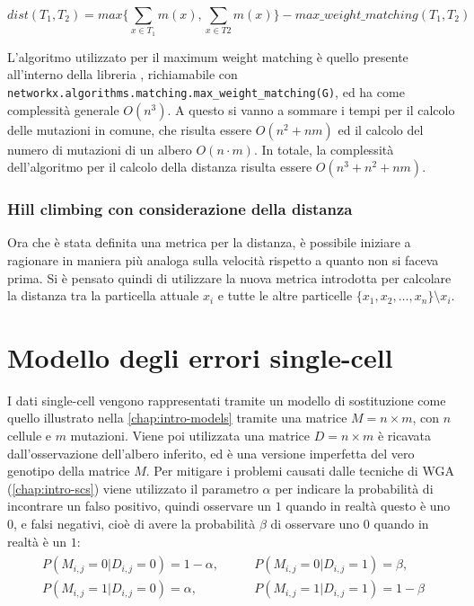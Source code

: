 \begin{equation}
  \label{eq:pso-adapt-calculate-2-algo-1}
  dist(T_1, T_2) = max \{ \sum_{x \in T_1} m(x), \sum_{x \in T2} m(x) \} - max\_weight\_matching(T_1, T_2)
\end{equation}

L'algoritmo utilizzato per il maximum weight matching è quello presente all'interno della libreria , 
richiamabile con \texttt{networkx.algorithms.matching.max\_weight\_matching(G)}, ed ha come complessità generale $O(n^3)$. A questo si vanno a sommare i tempi per il calcolo delle mutazioni in comune, che risulta essere $O(n^2 + nm)$ ed il calcolo del numero di mutazioni di un albero $O(n \cdot m)$. In totale, la complessità dell'algoritmo per il calcolo della distanza risulta essere $O(n^3 + n^2 + nm)$.

\subsubsection{Hill climbing con considerazione della distanza}
Ora che è stata definita una metrica per la distanza, è possibile iniziare a ragionare in maniera più analoga sulla velocità rispetto a quanto non si faceva prima. Si è pensato quindi di utilizzare la nuova metrica introdotta per calcolare la distanza tra la particella attuale $x_i$ e tutte le altre particelle $\{x_1, x_2, \dots, x_n\} \setminus x_i$.

\section{Modello degli errori single-cell}
\label{chap:pso-matrix}
I dati single-cell vengono rappresentati tramite un modello di sostituzione come quello illustrato nella \autoref{chap:intro-models} tramite una matrice $M = n \times m$, con $n$ cellule e $m$ mutazioni. Viene poi utilizzata una matrice $D = n \times m$ è ricavata dall'osservazione dell'albero inferito, ed è una versione imperfetta del vero genotipo della matrice $M$. Per mitigare i problemi causati dalle tecniche di WGA (\autoref{chap:intro-scs}) viene utilizzato il parametro $\alpha$ per indicare la probabilità di incontrare un falso positivo, quindi osservare un $1$ quando in realtà questo è uno $0$, e falsi negativi, cioè di avere la probabilità $\beta$ di osservare uno $0$ quando in realtà è un $1$:
\begin{align}
    \label{eq:pso-intro-model-matrix}
    \begin{split}
      P(M_{i,j} = 0 | D_{i,j} = 0) = 1 - \alpha, \qquad
      &P(M_{i,j} = 0 | D_{i,j} = 1) = \beta, \\
      P(M_{i,j} = 1 | D_{i,j} = 0) = \alpha, \qquad
      &P(M_{i,j} = 1 | D_{i,j} = 1) = 1 - \beta
    \end{split}
\end{align}

